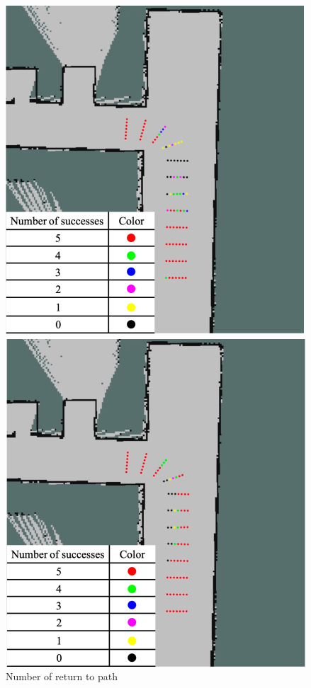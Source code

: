 \documentclass{jarticle}
\begin{document}
\begin{figure}[htbp]
  \begin{minipage}[t]{0.5\linewidth}
    \centering
    \includegraphics[keepaspectratio, scale=0.2]{figs/a.png}
  \end{minipage}
  \begin{minipage}[t]{0.5\linewidth}
    \centering
    \includegraphics[keepaspectratio, scale=0.2]{figs/b.png}
  \end{minipage}\vspace*{2mm}
  \caption{Number of return to path}
\end{figure}
\end{document}
